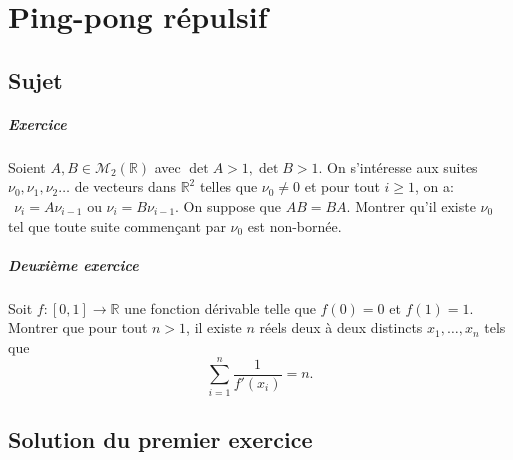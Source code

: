 \chapter{Ping-pong répulsif}

\section{Sujet}
\paragraph {Exercice}
Soient $A , B \in \mathcal M_2 (\mathbb R)$  avec $ \det A>1,\det B>1$. On s'intéresse aux suites $\nu_0,\nu_1, \nu_2 \dots$ de vecteurs dans $\mathbb R^2$ telles que $\nu_0 \neq 0$ et pour tout $i \geqslant1$, on a:   $\:\: \nu_i = A\nu_{i-1}$ ou $\nu_i = B \nu_{i-1}$.
On suppose que $AB = BA$. Montrer qu'il existe $\nu_ 0$ tel que toute suite commençant par $\nu_0$ est non-bornée.

\paragraph{Deuxième exercice}
Soit \( f : [0, 1] \rightarrow \mathbb R \) une fonction dérivable telle que \( f(0) = 0 \) et \( f(1) = 1 \).
Montrer que pour tout \( n > 1 \), il existe \( n \) réels deux à deux distincts \( x_1, \ldots , x_n \) tels que
\[ \sum_{i=1}^n \dfrac{1}{f'(x_i)} = n. \]

\section{Solution du premier exercice}




